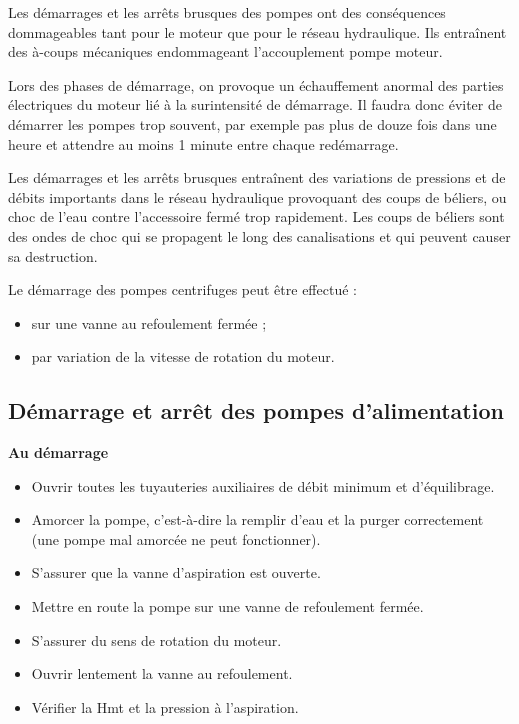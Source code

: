 Les démarrages et les arrêts brusques des pompes ont des conséquences dommageables tant pour le moteur que pour le réseau hydraulique. Ils entraînent des à-coups mécaniques endommageant l’accouplement pompe moteur.
\vspace{0.3cm}

Lors des phases de démarrage, on provoque un échauffement anormal des parties électriques du moteur lié à la surintensité de démarrage. Il faudra donc éviter de démarrer les pompes trop souvent, par exemple pas plus de douze fois dans une heure et attendre au moins 1 minute entre chaque redémarrage.
\vspace{0.3cm}

Les démarrages et les arrêts brusques entraînent des variations de pressions et de débits importants dans le réseau hydraulique provoquant des coups de béliers, ou choc de l’eau contre l’accessoire fermé trop rapidement.
Les coups de béliers sont des ondes de choc qui se propagent le long des canalisations et qui peuvent causer sa destruction.
\vspace{0.3cm}

Le démarrage des pompes centrifuges peut être effectué :

\begin{itemize}
\item  sur une vanne au refoulement fermée ;
\item  par variation de la vitesse de rotation du moteur.

\end{itemize}


\subsection{Démarrage et arrêt des pompes d'alimentation}

\textbf{Au démarrage}
\begin{itemize}
\item  Ouvrir toutes les tuyauteries auxiliaires de débit minimum et d’équilibrage.
\item  Amorcer la pompe, c’est-à-dire la remplir d’eau et la purger correctement (une pompe mal amorcée ne peut fonctionner).
\item  S’assurer que la vanne d’aspiration est ouverte.
\item  Mettre en route la pompe sur une vanne de refoulement fermée.
\item  S’assurer du sens de rotation du moteur.
\item  Ouvrir lentement la vanne au refoulement.
\item  Vérifier la Hmt et la pression à l’aspiration.

\end{itemize}


